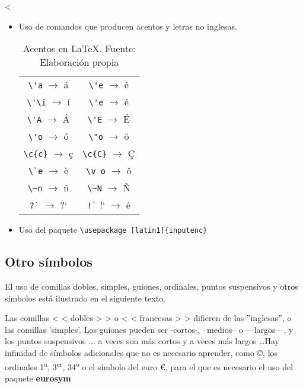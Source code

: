 <\documentclass[11pt,letter]{article} %
\begin{document}
          \begin{itemize}
          \item Uso de comandos que producen acentos y letras no inglesas.
               \begin{table}[H]
                    \centering
                    \begin{tabular}{c|c}
                         \hline
                         \verb|\'a| $\rightarrow $ á   & \verb|\'e| $\rightarrow $ é \\
                         \verb|\'\i| $\rightarrow $ í   & \verb|\'e| $\rightarrow $ é \\
                         \verb|\'A| $\rightarrow $ Á   & \verb|\'E| $\rightarrow $ É \\
                         \verb|\'o| $\rightarrow $ ó   & \verb|\"o| $\rightarrow $ \"o \\
                         \verb|\c{c}| $\rightarrow $ \c{c}   & \verb|\c{C}| $\rightarrow $ \c{C} \\
                         \verb|\`e| $\rightarrow $ \`e   & \verb|\v o| $\rightarrow $ \v o \\
                         \verb|\~n| $\rightarrow $ \~n   & \verb|\~N| $\rightarrow $ \~N \\
                         \verb|?`| $\rightarrow $ ?`   & \verb|!`| !` $\rightarrow $ é \\
                         \hline
                    \end{tabular}
                    \caption{Acentos en \LaTeX. Fuente: Elaboración propia}
                    \label{tab:acentos}
               \end{table}
          \item Uso del paquete \verb|\usepackage [latin1]{inputenc}|
          \end{itemize}

          \subsection{Otro símbolos}
          \label{sec:otrossimbolos}

          El uso de comillas dobles, simples, guiones, ordinales, puntos 
          suspensivos y otros símbolos está ilustrado en el siguiente texto.

          Las comillas < < dobles > > o < < francesas > > difieren de las 
          ''inglesas'', o las comillas 'simples'. Los guiones pueden ser -cortos-, 
          --medios-- o ---largos---, y los puntos suspensivos ... a veces son más 
          cortos y a veces más largos \dots Hay infinidad de símbolos adicionales 
          que no es necesario aprender, como \copyright, los ordinales 1\textsuperscript{a}, 
          3\textsuperscript{er}, 34\textsuperscript{o} o el símbolo del euro \euro, 
          para el que es necesario el uso del paquete {\bf eurosym}
\end{document}
